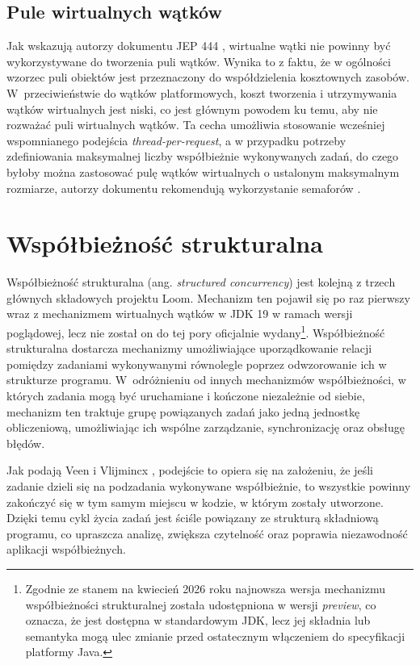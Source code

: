 \subsection{Pule wirtualnych wątków}
Jak wskazują autorzy dokumentu JEP 444 \cite{jep444}, wirtualne wątki nie powinny być wykorzystywane do tworzenia puli wątków. Wynika to z faktu, że w ogólności wzorzec puli obiektów jest przeznaczony do współdzielenia kosztownych zasobów. W~przeciwieństwie do wątków platformowych, koszt tworzenia i utrzymywania wątków wirtualnych jest niski, co jest głównym powodem ku temu, aby nie rozważać puli wirtualnych wątków. Ta cecha umożliwia stosowanie wcześniej wspomnianego podejścia \emph{thread-per-request}, a w przypadku potrzeby zdefiniowania maksymalnej liczby współbieżnie wykonywanych zadań, do czego byłoby można zastosować pulę wątków wirtualnych o ustalonym maksymalnym rozmiarze, autorzy dokumentu rekomendują wykorzystanie semaforów \cite{java-semaphore}.

\section{Współbieżność strukturalna}

Współbieżność strukturalna (ang. \emph{structured concurrency}) jest kolejną z trzech głównych składowych projektu Loom. Mechanizm ten pojawił się po raz pierwszy wraz z mechanizmem wirtualnych wątków w JDK 19 w ramach wersji poglądowej, lecz nie został on do tej pory oficjalnie wydany\footnote{Zgodnie ze stanem na kwiecień 2026 roku najnowsza wersja mechanizmu współbieżności strukturalnej została udostępniona w wersji \textit{preview}, co oznacza, że jest dostępna w standardowym JDK, lecz jej składnia lub semantyka mogą ulec zmianie przed ostatecznym włączeniem do specyfikacji platformy Java.}. Współbieżność strukturalna dostarcza mechanizmy umożliwiające uporządkowanie relacji pomiędzy zadaniami wykonywanymi równolegle poprzez odwzorowanie ich w strukturze programu. W~odróżnieniu od innych mechanizmów współbieżności, w których zadania mogą być uruchamiane i kończone niezależnie od siebie, mechanizm ten traktuje grupę powiązanych zadań jako jedną jednostkę obliczeniową, umożliwiając ich wspólne zarządzanie, synchronizację oraz obsługę błędów. \cite{jep525}

Jak podają Veen i Vlijmincx \cite{veen2024}, podejście to opiera się na założeniu, że jeśli zadanie dzieli się na podzadania wykonywane współbieżnie, to wszystkie powinny zakończyć się w tym samym miejscu w kodzie, w którym zostały utworzone. Dzięki temu cykl życia zadań jest ściśle powiązany ze strukturą składniową programu, co upraszcza analizę, zwiększa czytelność oraz poprawia niezawodność aplikacji współbieżnych.

